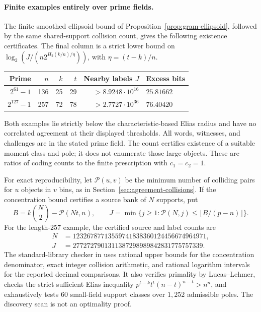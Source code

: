 \paragraph{Finite examples entirely over prime fields.}
The finite smoothed ellipsoid bound of
Proposition~\ref{prop:gram-ellipsoid}, followed by the same
shared-support collision count, gives the following existence
certificates. The final column is a strict lower bound on
$\log_2(J/(n2^{H_2(k/n)/\eta}))$, with $\eta=(t-k)/n$.
\begin{center}
\begin{tabular}{@{}rrrrrl@{}}
\toprule
Prime & $n$ & $k$ & $t$ & Nearby labels $J$ & Excess bits\\
\midrule
$2^{61}-1$ &136&25&29&$>8.9248\cdot10^{16}$&$25.81662$\\
$2^{127}-1$&257&72&78&$>2.7727\cdot10^{36}$&$76.40420$\\
\bottomrule
\end{tabular}
\end{center}
Both examples lie strictly below the characteristic-based Elias radius
and have no correlated agreement at their displayed thresholds.
All words, witnesses, and challenges are in the stated prime field.
The count certifies existence of a suitable moment class and pole; it
does not enumerate those large objects. These are ratios of coding
counts to the finite prescription with $c_1=c_2=1$.

For exact reproducibility, let $\mathcal P(u,v)$ be the minimum number
of colliding pairs for $u$ objects in $v$ bins, as in
Section~\ref{sec:agreement-collisions}. If the concentration bound
certifies a source bank of $N$ supports, put
\[
 B=k\binom N2-\mathcal P(Nt,n),\qquad
 J=\min\{j\ge1:\mathcal P(N,j)\le\lfloor B/(p-n)\rfloor\}.
\]
For the length-$257$ example, the certified source and label counts are
\[
 \begin{split}
 N&=12326787713559741838360124456674964971,\\
 J&=2772727901311387298989842831775757339.
 \end{split}
\]
The standard-library checker in
 uses rational upper bounds
for the concentration denominator, exact integer collision arithmetic,
and rational logarithm intervals for the reported decimal comparisons.
It also verifies primality by Lucas--Lehmer, checks the strict sufficient
Elias inequality $p^{t-k}t^t(n-t)^{n-t}>n^n$, and exhaustively tests
$60$ small-field support classes over $1{,}252$ admissible poles.
The discovery scan is not an optimality proof.
